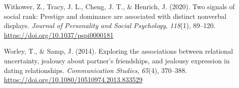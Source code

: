 \documentclass[
  donotrepeattitle,doc, 12pt, a4paper,floatsintext]{apa7}
\newlength{\cslhangindent}
\newlength{\cslentryspacingunit} %
\newenvironment{CSLReferences}[2] %
 {%
  \setlength{\parindent}{0pt}
  \ifodd #1
  \let\oldpar\par
  \def\par{\hangindent=\cslhangindent\oldpar}
  \fi
  \setlength{\parskip}{#2\cslentryspacingunit}
 }%
 {}
\begin{document}
\begin{CSLReferences}{1}{0}
\leavevmode{}%
Witkower, Z., Tracy, J. L., Cheng, J. T., \& Henrich, J. (2020). Two signals of social rank: Prestige and dominance are associated with distinct nonverbal displays. \emph{Journal of Personality and Social Psychology}, \emph{118}(1), 89--120. \url{https://doi.org/10.1037/pspi0000181}

\leavevmode{}%
Worley, T., \& Samp, J. (2014). Exploring the associations between relational uncertainty, jealousy about partner's friendships, and jealousy expression in dating relationships. \emph{Communication Studies}, \emph{65}(4), 370--388. \url{https://doi.org/10.1080/10510974.2013.833529}

\end{CSLReferences}

\endgroup
\end{document}
